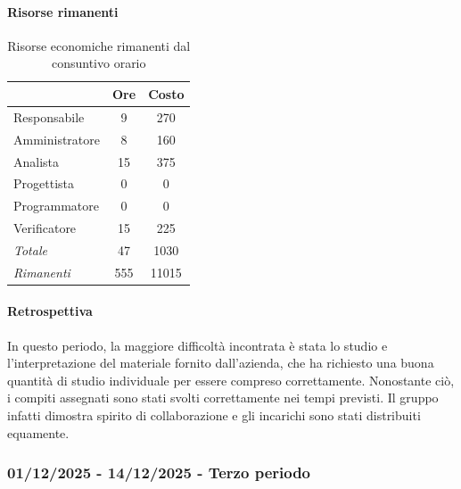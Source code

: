 \documentclass[a4paper,12pt]{article}
\begin{document}
            \paragraph{Risorse rimanenti}
                \begin{table}[H]
                \centering
                \caption{Risorse economiche rimanenti dal consuntivo orario}
                \begin{tabular}{|l|c|c|}
                \hline
                    \rowcolor{lightgray}{\textbf{Ruolo}} & {\textbf{Ore}} & {\textbf{Costo}}\\
                \hline
                    Responsabile & 9 & 270\\
                \hline
                    Amministratore & 8 & 160\\
                \hline
                    Analista & 15 & 375\\
                \hline
                    Progettista & 0 & 0\\
                \hline
                    Programmatore & 0 & 0\\
                \hline
                    Verificatore & 15 & 225\\
                \hline
                    \rowcolor{lightgray}\textit{Totale} & 47 & 1030\\
                \hline
                    \rowcolor{lightgray}\textit{Rimanenti} & 555 & 11015\\
                \hline
                \end{tabular}
                \end{table}
                
            \paragraph{Retrospettiva}
            In questo periodo, la maggiore difficoltà incontrata è stata lo studio e l'interpretazione del materiale fornito dall'azienda, che ha richiesto una buona quantità di studio individuale per essere compreso correttamente. Nonostante ciò, i compiti assegnati sono stati svolti correttamente nei tempi previsti. Il gruppo infatti dimostra spirito di collaborazione e gli incarichi sono stati distribuiti equamente.

        \subsubsection{01/12/2025 - 14/12/2025 - Terzo periodo}
\end{document}
